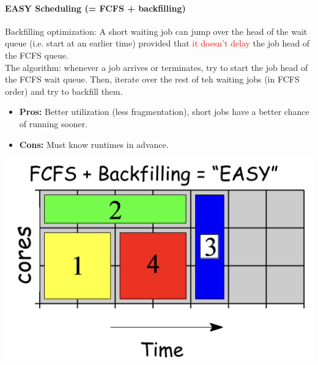 \documentclass[openany,12pt]{book}
\newcommand{\red}[1]{\textcolor{Red}{#1}}
\begin{document}
\begin{center}
    \begin{minipage}{0.65\textwidth}
        \vspace{0pt} %
        \paragraph{EASY Scheduling (= FCFS + backfilling)} Backfilling optimization: A short waiting job can jump over the head of the wait queue (i.e. start at an earlier time) provided that \red{it doesn't delay} the job \@ head of the FCFS queue.\\

        The algorithm: whenever a job arrives or terminates, try to start the job \@ head of the FCFS wait queue. Then, iterate over the rest of teh waiting jobs (in FCFS order) and try to backfill them.

        \begin{itemize}
            \item \textbf{Pros:} Better utilization (less fragmentation), short jobs have a better chance of running sooner.
            \item \textbf{Cons:} Must know runtimes in advance.
        \end{itemize}
    \end{minipage}\hfill
    \begin{minipage}{0.3\textwidth}
        \vspace{0pt} %
        \centering
        \includegraphics[width=\linewidth]{EASY.png}
    \end{minipage}
\end{center}
\end{document}

